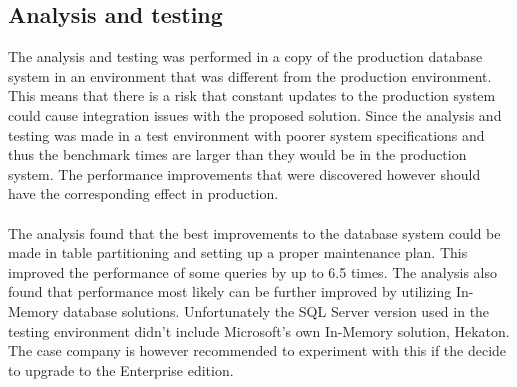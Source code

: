 \documentclass{cslthse-msc}
\begin{document}
\subsection{Analysis and testing}
The analysis and testing was performed in a copy of the production database system in an environment that was different from the production environment. This means that there is a risk that constant updates to the production system could cause integration issues with the proposed solution.
Since the analysis and testing was made in a test environment with poorer system specifications and thus the benchmark times are larger than they would be in the production system. The performance improvements that were discovered however should have the corresponding effect in production.\\\\ The analysis found that the best improvements to the database system could be made in table partitioning and setting up a proper maintenance plan. This improved the performance of some queries by up to 6.5 times. The analysis also found that performance most likely can be further improved by utilizing In-Memory database solutions. Unfortunately the SQL Server version used in the testing environment didn't include Microsoft's own In-Memory solution, Hekaton. The case company is however recommended to experiment with this if the decide to upgrade to the Enterprise edition. 




\end{document}
